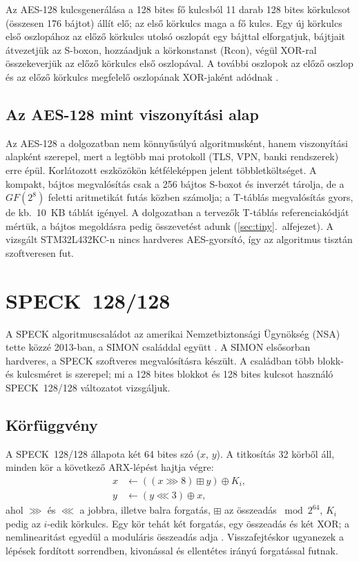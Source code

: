 \documentclass[a4paper,12pt]{report}
\theoremstyle{definition}
\theoremstyle{remark}
\begin{document}
Az AES-128 kulcsgenerálása a 128 bites fő kulcsból 11 darab 128 bites körkulcsot (összesen 176 bájtot) állít elő; az első körkulcs maga a fő kulcs. Egy új körkulcs első oszlopához az előző körkulcs utolsó oszlopát egy bájttal elforgatjuk, bájtjait átvezetjük az S-boxon, hozzáadjuk a körkonstanst (Rcon), végül XOR-ral összekeverjük az előző körkulcs első oszlopával. A további oszlopok az előző oszlop és az előző körkulcs megfelelő oszlopának XOR-jaként adódnak \cite{DaemenRijmen2002}.

\subsection{Az AES-128 mint viszonyítási alap}

Az AES-128 a dolgozatban nem könnyűsúlyú algoritmusként, hanem viszonyítási alapként szerepel, mert a legtöbb mai protokoll (TLS, VPN, banki rendszerek) erre épül. Korlátozott eszközökön kétféleképpen jelent többletköltséget. A kompakt, bájtos megvalósítás csak a 256 bájtos S-boxot és inverzét tárolja, de a $GF(2^8)$ feletti aritmetikát futás közben számolja; a T-táblás megvalósítás gyors, de kb.\ 10~KB táblát igényel. A dolgozatban a tervezők T-táblás referenciakódját mértük, a bájtos megoldásra pedig összevetést adunk (\ref{sec:tiny}.~alfejezet). A vizsgált STM32L432KC-n nincs hardveres AES-gyorsító, így az algoritmus tisztán szoftveresen fut.

\section{SPECK~128/128}\label{sec:speck}

A SPECK algoritmuscsaládot az amerikai Nemzetbiztonsági Ügynökség (NSA) tette közzé 2013-ban, a SIMON családdal együtt \cite{Beaulieu2013}. A SIMON elsősorban hardveres, a SPECK szoftveres megvalósításra készült. A családban több blokk- és kulcsméret is szerepel; mi a 128 bites blokkot és 128 bites kulcsot használó SPECK~128/128 változatot vizsgáljuk.

\subsection{Körfüggvény}\label{sec:speck_kor}

A SPECK~128/128 állapota két 64 bites szó ($x$, $y$). A titkosítás 32 körből áll, minden kör a következő ARX-lépést hajtja végre:
\begin{align}
x &\leftarrow ((x \ggg 8) \mathbin{\boxplus} y) \oplus K_i, \label{eq:speck_round1}\\
y &\leftarrow (y \lll 3) \oplus x, \label{eq:speck_round2}
\end{align}
ahol $\ggg$ és $\lll$ a jobbra, illetve balra forgatás, $\boxplus$ az összeadás $\bmod 2^{64}$, $K_i$ pedig az $i$-edik körkulcs. Egy kör tehát két forgatás, egy összeadás és két XOR; a nemlinearitást egyedül a moduláris összeadás adja \cite{Beaulieu2013}. Visszafejtéskor ugyanezek a lépések fordított sorrendben, kivonással és ellentétes irányú forgatással futnak.
\end{document}
